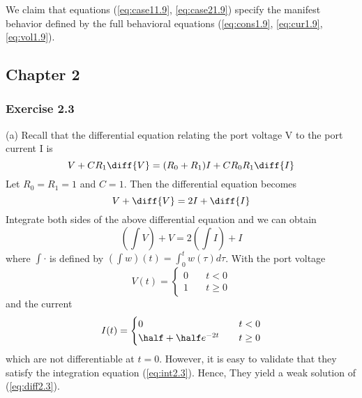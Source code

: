 We claim that equations (\ref{eq:case11.9}, \ref{eq:case21.9}) specify the manifest behavior defined by the full behavioral equations (\ref{eq:cons1.9}, \ref{eq:cur1.9}, \ref{eq:vol1.9}).


\subsection{Chapter 2}
\subsubsection{Exercise 2.3}
(a) Recall that the differential equation relating the port voltage V to the port current I is 
\begin{equation}
    V + CR_1\diff{V} = (R_0+R_1)I + CR_0R_1\diff{I}
\end{equation}
Let $R_0=R_1=1$ and $C=1$. Then the differential equation becomes
\begin{equation}\label{eq:diff2.3}
    V + \diff{V} = 2I + \diff{I}
\end{equation}
Integrate both sides of the above differential equation and we can obtain
\begin{equation}\label{eq:int2.3}
    (\int V) + V = 2(\int I) + I
\end{equation}
where $\int \cdot$ is defined by $(\int w)(t) = \int_0^t w(\tau)d\tau$. With the port voltage 
\begin{equation}
    V(t) = 
    \begin{cases}
    0 \quad  &t<0    \\
    1 \quad  &t\geq0   
    \end{cases}
\end{equation}
and the current 
\begin{equation}
    I(t) = 
    \begin{cases}
    0 \quad  &t<0    \\
    \half + \half e^{-2t} \quad  &t\geq0   
    \end{cases}
\end{equation}
which are not differentiable at $t=0$. However, it is easy to validate that they satisfy the integration equation (\ref{eq:int2.3}). Hence, They yield a weak solution of (\ref{eq:diff2.3}).

